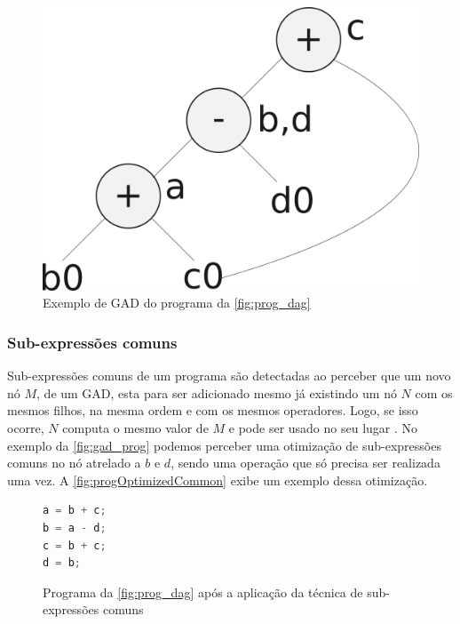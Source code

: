 \begin{figure}[htb]
	\caption{\label{fig:gad_prog} Exemplo de GAD do programa da \autoref{fig:prog_dag}}
	\begin{center}
	    \includegraphics[scale=0.25]{resources/prog_gad.png}
	\end{center}
\end{figure}

\subsubsection{Sub-expressões comuns}
Sub-expressões comuns de um programa são detectadas ao perceber que um novo nó $M$, de um GAD,  esta para ser adicionado mesmo já existindo um nó $N$ com os mesmos filhos, na mesma ordem e com os mesmos operadores. Logo, se isso ocorre, $N$ computa o mesmo valor de $M$ e pode ser usado no seu lugar \cite{Aho:1986}. No exemplo da \autoref{fig:gad_prog} podemos perceber uma otimização de sub-expressões comuns no nó atrelado a $b$ e $d$, sendo uma operação que só precisa ser realizada uma vez. A \autoref{fig:progOptimizedCommon} exibe um exemplo dessa otimização.
\begin{figure}[H]
	\caption{\label{fig:progOptimizedCommon} Programa da \autoref{fig:prog_dag} após a aplicação da técnica de sub-expressões comuns }
	\begin{center}
    \begin{minipage}{0.5\textwidth}
    \begin{lstlisting}[language=C]       
a = b + c; 
b = a - d;
c = b + c;
d = b;
	\end{lstlisting}
    \end{minipage}
	\end{center}
\end{figure}


